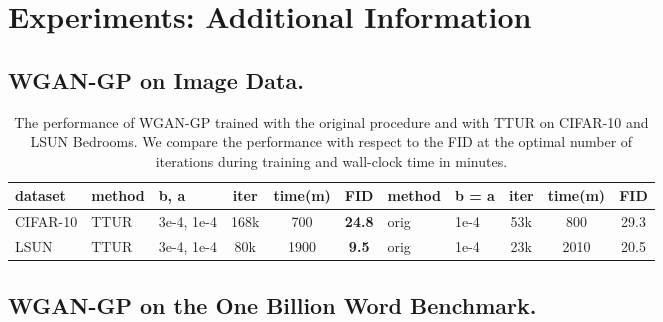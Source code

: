 \documentclass{article}
\begin{document}
\section{Experiments: Additional Information}
\label{sec:apx_experiments}

\subsection{WGAN-GP on Image Data.}

\begin{table}[htp]
\begin{center}
\caption[Results WGAN-GP on Image Data]{The performance of WGAN-GP trained with
the original procedure and with TTUR on CIFAR-10 and LSUN Bedrooms. We compare
the performance with respect to the FID at the optimal number of
iterations during training and wall-clock time in minutes.}
\label{tab:wgan_gp_image}
\begin{tabular}{lllcccllccc}
 \toprule
 dataset & method & b, a & iter & time(m) & FID & method & b = a & iter & time(m) & FID \\
 \midrule
 CIFAR-10 & TTUR & 3e-4, 1e-4 & 168k & 700 &  {\bf 24.8} &
 orig & 1e-4 & 53k & 800 & 29.3 \\
 LSUN & TTUR & 3e-4, 1e-4 & 80k & 1900 &  {\bf 9.5} &
 orig & 1e-4 & 23k & 2010 & 20.5 \\
 \bottomrule
 \end{tabular}
 \end{center}
\end{table}

\subsection{WGAN-GP on the One Billion Word Benchmark.}
\end{document}

